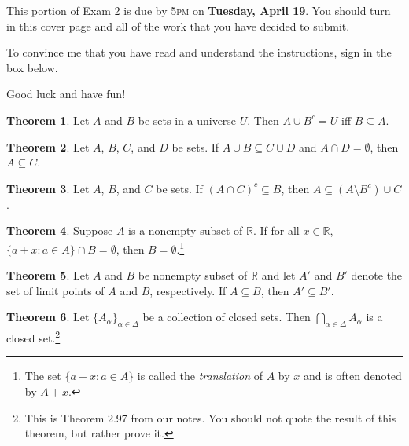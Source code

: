 \documentclass[11pt]{article}
\theoremstyle{definition}
\newtheorem{theorem}{Theorem}
\begin{document}
This portion of  Exam 2 is due by 5\textsc{pm} on \textbf{Tuesday, April 19}.  You should turn in this cover page and all of the work that you have decided to submit.

\bigskip

To convince me that you have read and understand the instructions, sign in the box below.

\bigskip


\bigskip

Good luck and have fun!

\newpage

\begin{theorem}
Let $A$ and $B$ be sets in a universe $U$.  Then $A\cup B^{c}=U$ iff $B\subseteq A$.
\end{theorem}

\begin{theorem}
Let $A$, $B$, $C$, and $D$ be sets.  If $A\cup B\subseteq C\cup D$ and $A\cap D=\emptyset$, then $A\subseteq C$.
\end{theorem}

\begin{theorem}
Let $A$, $B$, and $C$ be sets.  If $(A\cap C)^{c}\subseteq B$, then $A\subseteq (A\setminus B^{c})\cup C$.
\end{theorem}

\begin{theorem}
Suppose $A$ is a nonempty subset of $\mathbb{R}$.  If for all $x\in\mathbb{R}$, $\{a+x:a\in A\}\cap B=\emptyset$, then $B=\emptyset$.\footnote{The set $\{a+x:a\in A\}$ is called the \emph{translation} of $A$ by $x$ and is often denoted by $A+x$.}
\end{theorem}

\begin{theorem}
Let $A$ and $B$ be nonempty subset of $\mathbb{R}$ and let $A'$ and $B'$ denote the set of limit points of $A$ and $B$, respectively.  If $A\subseteq B$, then $A'\subseteq B'$.
\end{theorem}

\begin{theorem}
Let $\{A_{\alpha}\}_{\alpha\in\Delta}$ be a collection of closed sets.  Then $\displaystyle \bigcap_{\alpha\in \Delta} A_{\alpha}$ is a closed set.\footnote{This is Theorem 2.97 from our notes.  You should not quote the result of this theorem, but rather prove it.}
\end{theorem}
\end{document}
